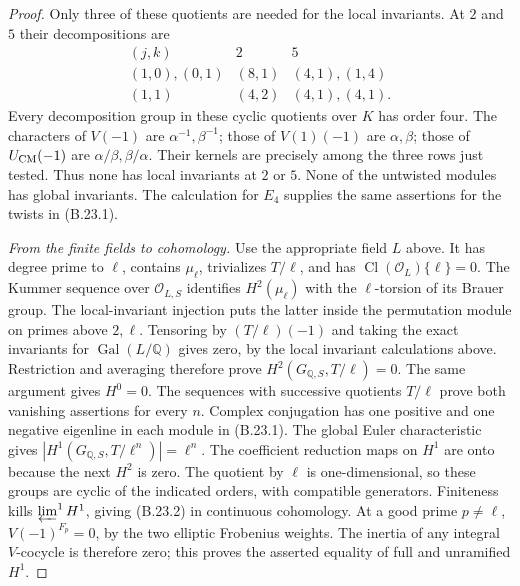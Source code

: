 \begin{proof}
Only three of these quotients are needed for the local
invariants. At $2$ and $5$ their decompositions are
\[
 \begin{array}{c|c|c}
 (j,k)&2&5\\ \hline
 (1,0),(0,1)&(8,1)&(4,1),(1,4)\\
 (1,1)&(4,2)&(4,1),(4,1).
 \end{array}                                                    \tag{B.23.11}
\]
Every decomposition group in these cyclic quotients over $K$
has order four. The characters of $V(-1)$ are
$\alpha^{-1},\beta^{-1}$; those of $V(1)(-1)$ are
$\alpha,\beta$; those of $U_{\rm CM}(-1)$ are
$\alpha/\beta,\beta/\alpha$. Their kernels are precisely
among the three rows just tested. Thus none has local
invariants at $2$ or $5$. None of the untwisted modules
has global invariants. The calculation for $E_4$ supplies
the same assertions for the twists in (B.23.1).

\emph{From the finite fields to cohomology.}
Use the appropriate field $L$ above. It has degree prime
to $\ell$, contains $\mu_\ell$, trivializes $T/\ell$, and
has $\operatorname{Cl}(\mathcal O_L)\{\ell\}=0$.
The Kummer sequence over $\mathcal O_{L,S}$ identifies
$H^2(\mu_\ell)$ with the $\ell$-torsion of its Brauer group.
The local-invariant injection puts the latter inside the
permutation module on primes above $2,\ell$.
Tensoring by $(T/\ell)(-1)$ and taking the exact invariants
for $\operatorname{Gal}(L/\mathbb Q)$ gives zero, by the
local invariant calculations above. Restriction and averaging
therefore prove $H^2(G_{\mathbb Q,S},T/\ell)=0$.
The same argument gives $H^0=0$.
The sequences with successive quotients $T/\ell$ prove
both vanishing assertions for every $n$.
Complex conjugation has one positive and one negative
eigenline in each module in (B.23.1).
The global Euler characteristic
\citep[I, Theorem 5.1]{BMilne2006} gives
$|H^1(G_{\mathbb Q,S},T/\ell^n)|=\ell^n$.
The coefficient reduction maps on $H^1$ are onto because
the next $H^2$ is zero. The quotient by $\ell$ is
one-dimensional, so these groups are cyclic of the indicated
orders, with compatible generators.
Finiteness kills $\varprojlim^1 H^1$, giving (B.23.2) in
continuous cohomology. At a good prime $p\ne\ell$,
$V(-1)^{F_p}=0$, by the two elliptic Frobenius weights.
The inertia of any integral $V$-cocycle is therefore zero;
this proves the asserted equality of full and unramified $H^1$.


\end{proof}
